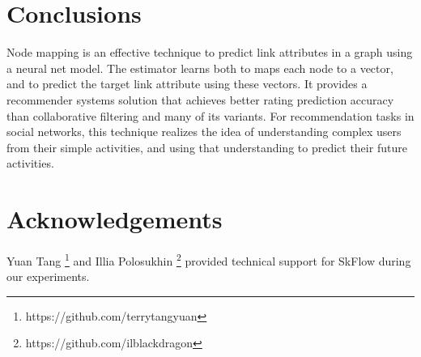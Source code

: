 \documentclass[twocolumn]{article}
\begin{document}
\section{Conclusions}
Node mapping is an effective technique to predict link attributes in a graph 
using a neural net model.
The estimator learns both to maps each node to a vector, and to predict 
the target link attribute using these vectors.
It provides a recommender systems solution that achieves better rating 
prediction accuracy than collaborative filtering and many of its variants.
For recommendation tasks in social networks, this technique realizes the idea 
of understanding complex users from their simple activities, and using that 
understanding to predict their future activities.

\section*{Acknowledgements}
Yuan Tang \footnote{https://github.com/terrytangyuan} and Illia Polosukhin 
\footnote{https://github.com/ilblackdragon} provided technical support for 
SkFlow during our experiments.



\end{document}
